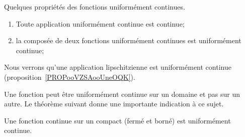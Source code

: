 \begin{proposition}
	Quelques propriétés des fonctions uniformément continues.
	\begin{enumerate}
		\item
			Toute application uniformément continue est continue;
		\item
			la composée de deux fonctions uniformément continues est uniformément continue;
	\end{enumerate}
\end{proposition}
Nous verrons qu'une application lipschitzienne est uniformément continue (proposition~\ref{PROPooVZSAooUneOQK}).

Une fonction peut être uniformément continue sur un domaine et pas sur un autre. Le théorème suivant donne une importante indication à ce sujet.
\begin{theorem}[Heine]		\label{ThoHeineContinueCompact}
	Une fonction continue sur un compact (fermé et borné) est uniformément continue.
\end{theorem}

